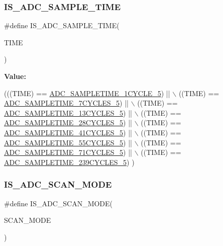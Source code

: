 \subsubsection{\texorpdfstring{I\+S\+\_\+\+A\+D\+C\+\_\+\+S\+A\+M\+P\+L\+E\+\_\+\+T\+I\+ME}{IS\_ADC\_SAMPLE\_TIME}}
{\footnotesize\ttfamily \#define I\+S\+\_\+\+A\+D\+C\+\_\+\+S\+A\+M\+P\+L\+E\+\_\+\+T\+I\+ME(\begin{DoxyParamCaption}\item[{}]{T\+I\+ME }\end{DoxyParamCaption})}

{\bfseries Value\+:}
\begin{DoxyCode}
(((TIME) == \hyperlink{group___a_d_c__sampling__times_ga01ae8ddd4c3f0a7cace13273c1e67fdd}{ADC\_SAMPLETIME\_1CYCLE\_5})    || \(\backslash\)
                                  ((TIME) == \hyperlink{group___a_d_c__sampling__times_gac0aff040aa3a0e63147fcdd8ab805af1}{ADC\_SAMPLETIME\_7CYCLES\_5})   || \(\backslash\)
                                  ((TIME) == \hyperlink{group___a_d_c__sampling__times_ga96ddc2c8f5aec56ef5b6dc7cf908842a}{ADC\_SAMPLETIME\_13CYCLES\_5})  || \(\backslash\)
                                  ((TIME) == \hyperlink{group___a_d_c__sampling__times_ga2fb67421195d0c9f1edb705dcfcd754f}{ADC\_SAMPLETIME\_28CYCLES\_5})  || \(\backslash\)
                                  ((TIME) == \hyperlink{group___a_d_c__sampling__times_ga190357836133681e150ddc7242151661}{ADC\_SAMPLETIME\_41CYCLES\_5})  || \(\backslash\)
                                  ((TIME) == \hyperlink{group___a_d_c__sampling__times_ga4ea55e3a10a04630820387755f4f448a}{ADC\_SAMPLETIME\_55CYCLES\_5})  || \(\backslash\)
                                  ((TIME) == \hyperlink{group___a_d_c__sampling__times_ga15c48307b1f2aed2a1c3c6338c13b070}{ADC\_SAMPLETIME\_71CYCLES\_5})  || \(\backslash\)
                                  ((TIME) == \hyperlink{group___a_d_c__sampling__times_ga7172f3d957445df5b98648b25ccc64d4}{ADC\_SAMPLETIME\_239CYCLES\_5})   )
\end{DoxyCode}
\mbox{\label{group___a_d_c___private___macros_gad86e7d7e94679a54f66e79b002f936f0}} 
\subsubsection{\texorpdfstring{I\+S\+\_\+\+A\+D\+C\+\_\+\+S\+C\+A\+N\+\_\+\+M\+O\+DE}{IS\_ADC\_SCAN\_MODE}}
{\footnotesize\ttfamily \#define I\+S\+\_\+\+A\+D\+C\+\_\+\+S\+C\+A\+N\+\_\+\+M\+O\+DE(\begin{DoxyParamCaption}\item[{}]{S\+C\+A\+N\+\_\+\+M\+O\+DE }\end{DoxyParamCaption})}

